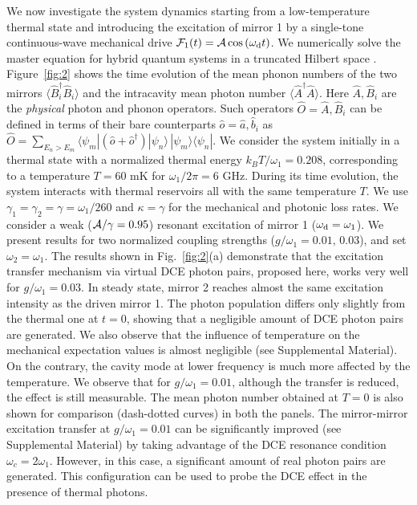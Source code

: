 \documentclass[aps,pra,twocolumn,floatfix,longbibliography, superscriptaddress]{revtex4-1}
\begin{document}
We now investigate the system dynamics starting from a low-temperature thermal state and introducing the excitation of mirror 1 by a single-tone continuous-wave mechanical drive
${\cal F}_1(t) = {\cal A} \cos{(\omega_{\rm d} t)}$. We numerically solve the master equation for hybrid quantum systems in a truncated Hilbert space \cite{Settineri2018}.  Figure~\ref{fig:2} shows the time evolution of the mean phonon numbers of the two mirrors $\langle \hat B_i^\dag \hat B_i \rangle$ and  the  intracavity mean photon number $\langle \hat A^\dag \hat A \rangle$. Here $\hat A, \hat B_i$ are the {\em physical} photon and phonon operators. Such operators  $\hat O = \hat A, \hat B_i$ can be defined in terms of their bare counterparts $\hat o = \hat a, \hat b_i$ as \cite{Ridolfo2012}
$
\hat O = \sum_{E_n > E_m} \langle \psi_m | (\hat o + \hat o^\dag) | \psi_n \rangle\, | \psi_m \rangle \langle \psi_n|$.
We consider the system initially in a thermal state  with a normalized thermal energy $k_B T / \omega_1 = 0.208$, corresponding to a temperature $T = 60$ mK for $\omega_1 / 2 \pi = 6$ GHz. During its time evolution, the system interacts with thermal reservoirs all with the same temperature $T$. We  use  $\gamma_1 = \gamma_2 = \gamma=  \omega_1 /260$ and $\kappa =  \gamma$ for the mechanical and photonic  loss rates. We consider a weak (${\cal A}/\gamma = 0.95$) resonant excitation of  mirror 1 ($\omega_{\rm d} = \omega_1$). We present results for two  normalized coupling strengths ($g/ \omega_{1} = 0.01,\, 0.03$), and set $\omega_2 = \omega_1$. The results shown in Fig.~\ref{fig:2}(a) demonstrate that the excitation transfer mechanism via virtual DCE photon pairs, proposed here, works very well for $g/\omega_1 = 0.03$.  In steady state, mirror 2 reaches almost the same excitation intensity as the driven mirror 1. The photon population differs only slightly from the thermal one at $t=0$, showing that a negligible amount of DCE photon pairs are generated. We also observe that the influence of temperature on the mechanical expectation values is almost negligible (see Supplemental Material). On the contrary, the cavity mode at lower frequency is much more affected by the temperature. We observe that for $g/ \omega_{1} = 0.01$, although the transfer is reduced, the effect is still measurable. The mean photon number obtained at $T=0$ is also shown for comparison (dash-dotted curves) in both the panels. The mirror-mirror excitation transfer at $g/ \omega_{1} = 0.01$ can be significantly improved (see Supplemental Material) by taking advantage of the DCE resonance condition  $\omega_c = 2 \omega_1$. However, in this case, a significant amount of real photon pairs are generated. This configuration can be used to probe the DCE effect in the presence of thermal photons. 
\end{document}
